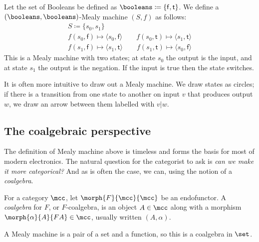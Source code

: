 \begin{example}\label{ex:mealy}
    Let the set of Booleans be defined as
    \(\booleans \coloneqq \{\mathsf{f},\mathsf{t}\}\).
    We define a \((\booleans,\booleans)\)-Mealy machine \((S, f)\) as follows:
    \begin{gather*}
        S \coloneqq \{s_0, s_1\}
        \\
        f(s_0, \mathsf{f}) \mapsto \langle{s_0, \mathsf{f}}\rangle
        \qquad
        f(s_0, \mathsf{t}) \mapsto \langle{s_1, \mathsf{t}}\rangle
        \\
        f(s_1, \mathsf{f}) \mapsto \langle{s_1, \mathsf{t}}\rangle
        \qquad
        f(s_1, \mathsf{t}) \mapsto \langle{s_0, \mathsf{f}}\rangle
    \end{gather*}
    This is a Mealy machine with two states; at state \(s_0\) the output is the
    input, and at state \(s_1\) the output is the negation.
    If the input is true then the state switches.

    It is often more intuitive to draw out a Mealy machine.
    We draw states as circles; if there is a transition from one state to
    another on input \(v\) that produces output \(w\), we draw an arrow between
    them labelled with \(v|w\).
    \begin{center}
        
    \end{center}
\end{example}

\subsection{The coalgebraic perspective}

The definition of Mealy machine above is timeless and forms the basis for most
of modern electronics.
The natural question for the categorist to ask is
\emph{can we make it more categorical?}
And as is often the case, we can, using the notion of a \emph{coalgebra}.

\begin{definition}[Coalgebra]
    For a category \(\mcc\), let \(\morph{F}{\mcc}{\mcc}\) be an endofunctor.
    A \emph{coalgebra} for \(F\), or \(F\)-coalgebra, is an object
    \(A \in \mcc\) along with a morphism \(\morph{\alpha}{A}{FA} \in \mcc\),
    usually written \((A,\alpha)\).
\end{definition}

A Mealy machine is a pair of a set
and a function, so this is a coalgebra in \(\set\).

